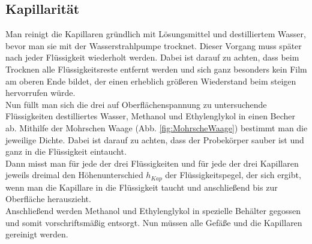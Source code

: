 \documentclass[12pt,a4paper,titlepage,headinclude,bibtotoc]{scrartcl}
\begin{document}
\subsection{Kapillarität}
Man reinigt die Kapillaren gründlich mit Lösungsmittel und destilliertem Wasser, bevor man sie mit der Wasserstrahlpumpe trocknet.
Dieser Vorgang muss später nach jeder Flüssigkeit wiederholt werden.
Dabei ist darauf zu achten, dass beim Trocknen alle Flüssigkeitsreste entfernt werden und sich ganz besonders kein Film am oberen Ende bildet, der einen erheblich größeren Wiederstand beim steigen hervorrufen würde.\\
Nun füllt man sich die drei auf Oberflächenspannung zu untersuchende Flüssigkeiten destilliertes Wasser, Methanol und Ethylenglykol in einen Becher ab.
Mithilfe der Mohrschen Waage (Abb. \ref{fig:MohrscheWaage}) bestimmt man die jeweilige Dichte.
Dabei ist darauf zu achten, dass der Probekörper sauber ist und ganz in die Flüssigkeit eintaucht.\\
Dann misst man für jede der drei Flüssigkeiten und für jede der drei Kapillaren jeweils dreimal den Höhenunterschied $h_{Kap}$ der Flüssigkeitspegel, der sich ergibt, wenn man die Kapillare in die Flüssigkeit taucht und anschließend bis zur Oberfläche herauszieht.\\
Anschließend werden Methanol und Ethylenglykol in spezielle Behälter gegossen und somit vorschriftsmäßig entsorgt.
Nun müssen alle Gefäße und die Kapillaren gereinigt werden.
\end{document}
